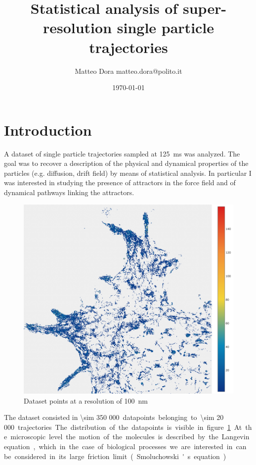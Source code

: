 \documentclass[a4paper]{article}
\title{Statistical analysis of super-resolution single particle trajectories}
\author{Matteo Dora \newline\newline \small{\mbox{matteo.dora@polito.it}}}
\date{\today}
\begin{document}
\maketitle

\section{Introduction}

A dataset of single particle trajectories sampled at \SI{125}{ms} was analyzed. The goal was to recover a description of the physical and dynamical properties of the particles (e.g. diffusion, drift field) by means of statistical analysis. In particular I was interested in studying the presence of attractors in the force field and of dynamical pathways linking the attractors.

\begin{figure}[h]
  \includegraphics[width=\linewidth]{img/01_datapoints.png}
  \caption{Dataset points at a resolution of \SI{100}{nm}}
  \label{fig:datapoints}
\end{figure}

The dataset consisted in \SI{\sim 350 000} datapoints belonging to \SI{\sim 20 000} trajectories. The distribution of the datapoints is visible in figure \ref{fig:datapoints}.

At the microscopic level the motion of the molecules is described by the Langevin equation, which in the case of biological processes we are interested in can be considered in its large friction limit (Smoluchowski's equation)
\end{document}
